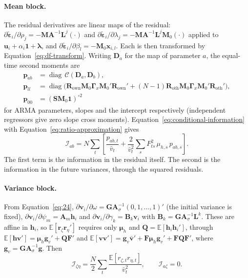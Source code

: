 \documentclass[12pt]{article}
\begin{document}
\paragraph{Mean block.} The residual derivatives are linear maps of the residual: $\partial\tilde{\boldsymbol\varepsilon}_i/\partial\rho_j=-\mathbf{MA}^{-1}\mathbf L^j(\cdot)$ and $\partial\tilde{\boldsymbol\varepsilon}_i/\partial\lambda_j=-\mathbf{MA}^{-1}\mathbf L^j\mathbf M_0(\cdot)$ applied to $\mathbf u_i+\alpha_i\mathbf 1+\boldsymbol\lambda$, and $\partial\tilde{\boldsymbol\varepsilon}_i/\partial\beta_l=-\mathbf M_0\mathbf x_{i,l}$. Each is then transformed by Equation~\ref{eq:df-transform}. Writing $\mathbf D_a$ for the map of parameter $a$, the equal-time second moments are
\begin{equation}
\begin{aligned}
\mathbf p_{ab}&=\operatorname{diag}\,\mathcal C(\mathbf D_a,\mathbf D_b),\\
\mathbf p_{ll}&=\operatorname{diag}\big(\mathbf R_{\mathrm{own}}\mathbf M_0\boldsymbol\Gamma_x\mathbf M_0'\mathbf R_{\mathrm{own}}'+(N-1)\mathbf R_{\mathrm{oth}}\mathbf M_0\boldsymbol\Gamma_x\mathbf M_0'\mathbf R_{\mathrm{oth}}'\big),\\
\mathbf p_{00}&=(\mathbf S\mathbf M_0\mathbf 1)^{\circ2}
\end{aligned}
\end{equation}
for ARMA parameters, slopes and the intercept respectively (independent regressors give zero slope cross moments). Equation~\ref{eq:conditional-information} with Equation~\ref{eq:ratio-approximation} gives
\begin{equation}
\mathcal I_{ab}=N\sum_t\left[\frac{p_{ab,t}}{\bar v_t}+\frac{2}{\bar v_t^2}\sum_s F_{ts}^2\,\mu_{h,s}\,p_{ab,s}\right].
\label{eq:mean-block}
\end{equation}
The first term is the information in the residual itself. The second is the information in the future variances, through the squared residuals.

\paragraph{Variance block.} From Equation~\ref{eq:24}, $\partial\mathbf v_i/\partial\omega=\mathbf{GA}_\sigma^{-1}(0,1,\dots,1)'$ (the initial variance is fixed), $\partial\mathbf v_i/\partial\psi_m=\mathbf A_m\mathbf h_i$ and $\partial\mathbf v_i/\partial\gamma_k=\mathbf B_k\mathbf v_i$ with $\mathbf B_k=\mathbf{GA}_\sigma^{-1}\mathbf L^k$. These are affine in $\mathbf h_i$, so $\mathbb E[\mathbf r_\zeta\mathbf r_\eta']$ requires only $\boldsymbol\mu_h$ and $\mathbf Q=\mathbb E[\mathbf h_i\mathbf h_i']$, through $\mathbb E[\mathbf h\mathbf v']=\boldsymbol\mu_h\mathbf g_v'+\mathbf Q\mathbf F'$ and $\mathbb E[\mathbf v\mathbf v']=\mathbf g_v\bar{\mathbf v}'+\mathbf F\boldsymbol\mu_h\mathbf g_v'+\mathbf F\mathbf Q\mathbf F'$, where $\mathbf g_v=\mathbf{GA}_\sigma^{-1}\mathbf g$. Then
\begin{equation}
\mathcal I_{\zeta\eta}=\frac N2\sum_t\frac{\mathbb E[r_{\zeta,t}r_{\eta,t}]}{\bar v_t^2},
\qquad \mathcal I_{a\zeta}=0.
\label{eq:garch-information}
\end{equation}
\end{document}
